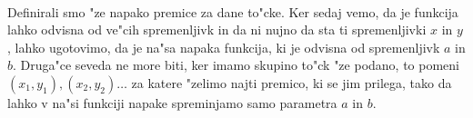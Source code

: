 \paragraph{}
Definirali smo "ze napako premice za dane to"cke. Ker sedaj vemo, da je funkcija lahko odvisna od ve"cih spremenljivk in da ni nujno da sta ti spremenljivki $x$ in $y$, lahko ugotovimo, da je na"sa napaka funkcija, ki je odvisna od spremenljivk $a$ in $b$. Druga"ce seveda ne more biti, ker imamo skupino to"ck "ze podano, to pomeni $(x_1, y_1), (x_2, y_2) \dots$ za katere "zelimo najti premico, ki se jim prilega, tako da lahko v na"si funkciji napake spreminjamo samo parametra $a$ in $b$.
